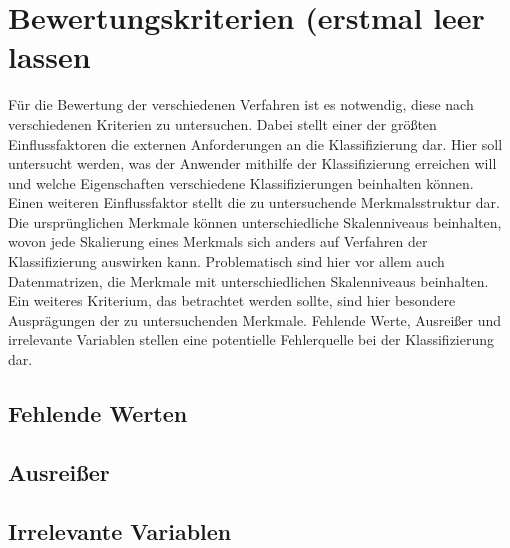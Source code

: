 \chapter{Bewertungskriterien (erstmal leer lassen}

Für die Bewertung der verschiedenen Verfahren ist es notwendig, diese nach verschiedenen Kriterien zu untersuchen. Dabei stellt einer der größten Einflussfaktoren die externen Anforderungen an die Klassifizierung dar. Hier soll untersucht werden, was der Anwender mithilfe der Klassifizierung erreichen will und welche Eigenschaften verschiedene Klassifizierungen beinhalten können. \\
Einen weiteren Einflussfaktor stellt die zu untersuchende Merkmalsstruktur dar. Die ursprünglichen Merkmale können unterschiedliche Skalenniveaus beinhalten, wovon jede Skalierung eines Merkmals sich anders auf Verfahren der Klassifizierung auswirken kann. Problematisch sind hier vor allem auch Datenmatrizen, die Merkmale mit unterschiedlichen Skalenniveaus beinhalten. \\
Ein weiteres Kriterium, das betrachtet werden sollte, sind hier besondere Ausprägungen der zu untersuchenden Merkmale. Fehlende Werte, Ausreißer und irrelevante Variablen stellen eine potentielle Fehlerquelle bei der Klassifizierung dar.

\section{Fehlende Werten}
\section{Ausreißer}
\section{Irrelevante Variablen}

